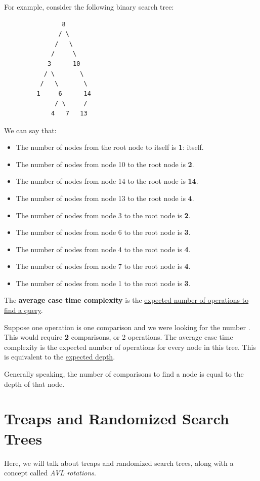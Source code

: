 \documentclass[letterpaper]{article}
\begin{document}
For example, consider the following binary search tree: 
\begin{verbatim}
                8 
               / \ 
              /   \ 
             /     \ 
            3      10
           / \       \ 
          /   \       \ 
         1     6      14
              / \     /
             4   7   13
\end{verbatim}
We can say that: 
\begin{itemize}
    \item The number of nodes from the root node to itself is \textbf{1}: itself. 
    \item The number of nodes from node 10 to the root node is \textbf{2}. 
    \item The number of nodes from node 14 to the root node is \textbf{14}.
    \item The number of nodes from node 13 to the root node is \textbf{4}. 
    \item The number of nodes from node 3 to the root node is \textbf{2}.
    \item The number of nodes from node 6 to the root node is \textbf{3}. 
    \item The number of nodes from node 4 to the root node is \textbf{4}. 
    \item The number of nodes from node 7 to the root node is \textbf{4}. 
    \item The number of nodes from node 1 to the root node is \textbf{3}. 
\end{itemize}
The \textbf{average case time complexity} is the \underline{expected number of operations to find a query}. 

\bigskip 

Suppose one operation is one comparison and we were looking for the number . This would require \textbf{2} comparisons, or 2 operations. The average case time complexity is the expected number of operations for every node in this tree. This is equivalent to the \underline{expected depth}. 

\bigskip 

Generally speaking, the number of comparisons to find a node is equal to the depth of that node. 


\newpage 
\section{Treaps and Randomized Search Trees}
Here, we will talk about treaps and randomized search trees, along with a concept called \emph{AVL rotations}.
\end{document}
